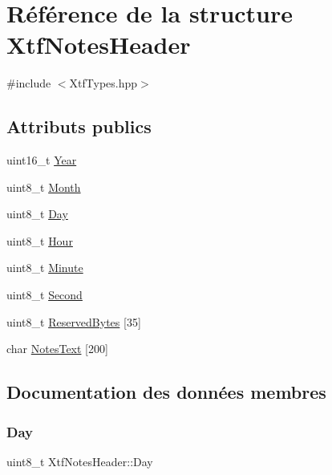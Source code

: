 \hypertarget{structXtfNotesHeader}{}\section{Référence de la structure Xtf\+Notes\+Header}
\label{structXtfNotesHeader}


{\ttfamily \#include $<$Xtf\+Types.\+hpp$>$}

\subsection*{Attributs publics}
\begin{DoxyCompactItemize}
\item 
uint16\+\_\+t \hyperlink{structXtfNotesHeader_ac477d6252e2175b05d09c4a10cd201c9}{Year}
\item 
uint8\+\_\+t \hyperlink{structXtfNotesHeader_a9a08c1c3dbb90d828650b16f56b08038}{Month}
\item 
uint8\+\_\+t \hyperlink{structXtfNotesHeader_a452e13e60fe670cfbb9b0baec34be932}{Day}
\item 
uint8\+\_\+t \hyperlink{structXtfNotesHeader_aad6af8709c5938ecf5a8df6e2234b3e6}{Hour}
\item 
uint8\+\_\+t \hyperlink{structXtfNotesHeader_a92c8de248511799df78712504f7ac3eb}{Minute}
\item 
uint8\+\_\+t \hyperlink{structXtfNotesHeader_a6ae594b3f7e1d0dad52eb58cb3c6b5d7}{Second}
\item 
uint8\+\_\+t \hyperlink{structXtfNotesHeader_a357cbac6ea7aba3cdff77414fd6058b2}{Reserved\+Bytes} \mbox{[}35\mbox{]}
\item 
char \hyperlink{structXtfNotesHeader_a160e2e2be10c157275a008d8e3f4de66}{Notes\+Text} \mbox{[}200\mbox{]}
\end{DoxyCompactItemize}


\subsection{Documentation des données membres}
\mbox{\label{structXtfNotesHeader_a452e13e60fe670cfbb9b0baec34be932}} 
\subsubsection{\texorpdfstring{Day}{Day}}
{\footnotesize\ttfamily uint8\+\_\+t Xtf\+Notes\+Header\+::\+Day}

